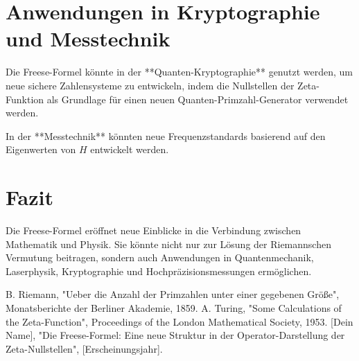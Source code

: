 \documentclass[a4paper,12pt]{article}
\begin{document}
\section{Anwendungen in Kryptographie und Messtechnik}
Die Freese-Formel könnte in der **Quanten-Kryptographie** genutzt werden, um neue sichere Zahlensysteme zu entwickeln, indem die Nullstellen der Zeta-Funktion als Grundlage für einen neuen Quanten-Primzahl-Generator verwendet werden.

In der **Messtechnik** könnten neue Frequenzstandards basierend auf den Eigenwerten von $H$ entwickelt werden.

\section{Fazit}
Die Freese-Formel eröffnet neue Einblicke in die Verbindung zwischen Mathematik und Physik. Sie könnte nicht nur zur Lösung der Riemannschen Vermutung beitragen, sondern auch Anwendungen in Quantenmechanik, Laserphysik, Kryptographie und Hochpräzisionsmessungen ermöglichen.

\begin{thebibliography}{9}
 B. Riemann, "Ueber die Anzahl der Primzahlen unter einer gegebenen Größe", Monatsberichte der Berliner Akademie, 1859.
 A. Turing, "Some Calculations of the Zeta-Function", Proceedings of the London Mathematical Society, 1953.
 [Dein Name], "Die Freese-Formel: Eine neue Struktur in der Operator-Darstellung der Zeta-Nullstellen", [Erscheinungsjahr].
\end{thebibliography}
\end{document}

